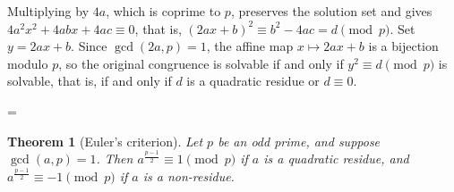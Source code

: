 \documentclass[11pt]{article}
\makeatletter
\theoremstyle{ntstyle}
\newtheorem{theorem}{Theorem}[subsection]
\let\nt@closedisplay\]
\def\nt@guardedclose{\@ifnextchar\par{\nt@closeafterpar}{\@ifnextchar\end{\postdisplaypenalty\@M\nt@closedisplay}{\nt@closedisplay}}}
\def\nt@closeafterpar\par{\@ifnextchar\par{\nt@closeafterpar}{\@ifnextchar\end{\postdisplaypenalty\@M\nt@closedisplay\par}{\nt@closedisplay\par}}}
\renewenvironment{proof}[1][\proofname]{\par
  \pushQED{\qed}\normalfont\topsep\medskipamount\edef\nt@afterproof{\@endparpenalty=\the\@endparpenalty\relax}\@beginparpenalty\@M\@endparpenalty\@M\let\]\nt@guardedclose\trivlist\item[]\textit{#1\@addpunct{.}} \ignorespaces}{\ifvmode\addpenalty\@M\fi\popQED\nt@afterproof\endtrivlist\@endpefalse}
\makeatother
\begin{document}
\begin{proof} Multiplying by $4a$, which is coprime to $p$,
	preserves the solution set and gives $4a^{2}x^{2} + 4abx + 4ac \equiv
		0$, that is, $(2ax + b)^{2} \equiv b^{2} - 4ac = d \pmod{p}$. Set $y =
		2ax + b$. Since $\gcd(2a, p) = 1$, the affine map $x \mapsto 2ax + b$
	is a bijection modulo $p$, so the original congruence is solvable if
	and only if $y^{2} \equiv d \pmod{p}$ is solvable, that is, if and only if
	$d$ is a quadratic residue or $d \equiv 0$.

\end{proof}
\begin{theorem}[Euler's criterion]\label{thm:7.1.2} Let $p$ be an
	odd prime, and suppose $\gcd(a, p) = 1$. Then $a^{\frac{p-1}{2}} \equiv 1
		\pmod{p}$ if $a$ is a quadratic residue, and $a^{\frac{p-1}{2}} \equiv -1 \pmod{p}$ if
	$a$ is a non-residue.

\end{theorem}
\end{document}
